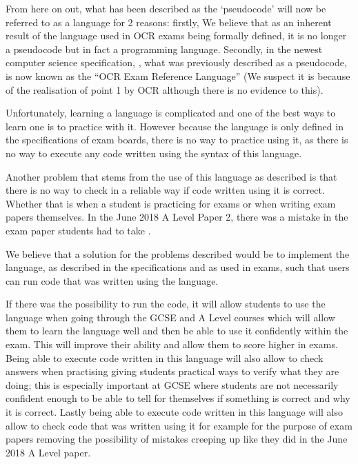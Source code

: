 \documentclass{article}
\begin{document}
From here on out, what has been described as the `pseudocode' will now be
referred to as a language for 2 reasons: firstly, We believe that as an
inherent result of the language used in OCR exams being formally defined, it is
no longer a pseudocode but in fact a programming language. Secondly, in the
newest computer science specification, \textcite{j277}, what was previously
described as a pseudocode, is now known as the ``OCR Exam Reference Language''
(We suspect it is because of the realisation of point 1 by OCR although there
is no evidence to this).

Unfortunately, learning a language is complicated and one of the best ways to
learn one is to practice with it. However because the language is only defined
in the specifications of exam boards, there is no way to practice using it, as
there is no way to execute any code written using the syntax of this language.

Another problem that stems from the use of this language as described is that
there is no way to check in a reliable way if code written using it is correct.
Whether that is when a student is practicing for exams or when writing exam
papers themselves. In the June 2018 A Level Paper 2, there was a mistake in the
exam paper students had to take \cite{ocrpec18}.


We believe that a solution for the problems described would be to implement the
language, as described in the specifications and as used in exams, such that
users can run code that was written using the language.

If there was the possibility to run the code, it will allow students to use the
language when going through the GCSE and A Level courses which will allow them
to learn the language well and then be able to use it confidently within the
exam. This will improve their ability and allow them to score higher in exams.
Being able to execute code written in this language will also allow to check
answers when practising giving students practical ways to verify what they are
doing; this is especially important at GCSE where students are not necessarily
confident enough to be able to tell for themselves if something is correct and
why it is correct. Lastly being able to execute code written in this language
will also allow to check code that was written using it for example for the
purpose of exam papers removing the possibility of mistakes creeping up like
they did in the June 2018 A Level paper.
\end{document}
